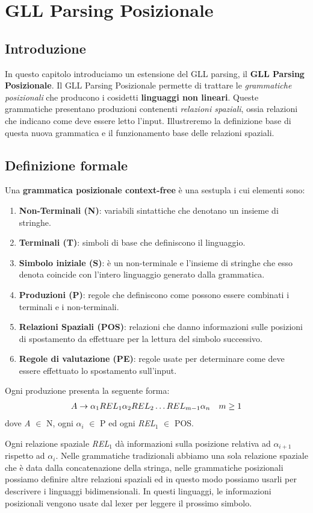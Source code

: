 \chapter{GLL Parsing Posizionale}
\section{Introduzione}
In questo capitolo introduciamo un estensione del GLL parsing, il \textbf{GLL Parsing Posizionale}. Il GLL Parsing Posizionale permette di trattare le \textit{grammatiche posizionali} che producono i cosidetti \textbf{linguaggi non lineari}. Queste grammatiche presentano produzioni contenenti \textit{relazioni spaziali}, ossia relazioni che indicano come deve essere letto l'input. Illustreremo la definizione base di questa nuova grammatica e il funzionamento base delle relazioni spaziali.
\section{Definizione formale}
Una \textbf{grammatica posizionale context-free} è una sestupla \cite{pubblicazione: tomita} i cui elementi sono:
\begin{enumerate}
	\item \textbf{Non-Terminali (N)}: variabili sintattiche che denotano un insieme di stringhe.
	\item \textbf{Terminali (T)}: simboli di base che definiscono il linguaggio.
	\item \textbf{Simbolo iniziale (S)}: è un non-terminale e l'insieme di stringhe che esso denota coincide con l'intero linguaggio generato dalla grammatica.
	\item \textbf{Produzioni (P)}: regole che definiscono come possono essere combinati i terminali e i non-terminali.
	\item \textbf{Relazioni Spaziali (POS)}: relazioni che danno informazioni sulle posizioni di spostamento da effettuare per la lettura del simbolo successivo.
	\item \textbf{Regole di valutazione (PE)}: regole usate per determinare come deve essere effettuato lo spostamento sull'input.
\end{enumerate}
Ogni produzione presenta la seguente forma:
\begin{align}
	A \to \alpha_{1} REL_1 \alpha_{2} REL_2 \dots REL_{m-1} \alpha_{n} \quad m \ge 1 \notag 
\end{align}
dove \textit{A} $\in$ N, ogni $\alpha_i$ $\in$ P ed ogni \textit{REL}$_1$ $\in$ POS.\par
\vspace{0.3cm}
\noindent Ogni relazione spaziale \textit{REL}$_1$ dà informazioni sulla posizione relativa ad $\alpha_{i+1}$ rispetto ad $\alpha_{i}$. Nelle grammatiche tradizionali abbiamo una sola relazione spaziale che è data dalla concatenazione della stringa, nelle grammatiche posizionali possiamo definire altre relazioni spaziali ed in questo modo possiamo usarli per descrivere i linguaggi bidimensionali. In questi linguaggi, le informazioni posizionali vengono usate dal lexer per leggere il prossimo simbolo.
